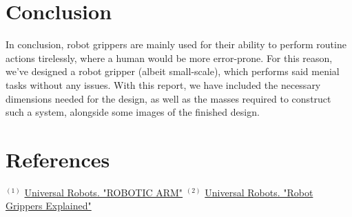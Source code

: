 \documentclass{article}
\begin{document}
\newpage
\section*{Conclusion}
In conclusion, robot grippers are mainly used for their ability to perform routine actions tirelessly,
where a human would be more error-prone. For this reason, we've designed a robot gripper (albeit small-scale), 
which performs said menial tasks without any issues. With this report, we have included the necessary dimensions 
needed for the design, as well as the masses required to construct such a system, alongside some images
of the finished design.

\newpage
\section*{References}
$^{(1)}$ \href{https://www.universal-robots.com/in/blog/robotic-arm/}{Universal Robots. "ROBOTIC ARM"}
$^{(2)}$ \href{https://www.universal-robots.com/blog/robot-grippers-explained/}{Universal Robots. "Robot Grippers Explained"}
\end{document}

